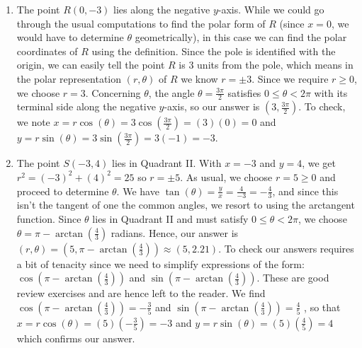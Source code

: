 {\begin{enumerate}
\item The point $R(0,-3)$ lies along the negative $y$-axis.  While we could go through the usual computations to find the polar form of $R$  (since $x=0$, we would have to determine $\theta$ geometrically), in this case we can find the polar coordinates of $R$ using the definition. Since the pole is identified with the origin, we can easily tell the point $R$ is $3$ units from the pole, which means in the polar representation $(r, \theta)$ of $R$ we know $r = \pm 3$.  Since we require $r \geq 0$, we choose $r = 3$.  Concerning $\theta$, the angle $\theta = \frac{3\pi}{2}$ satisfies $0 \leq \theta < 2\pi$ with its terminal side along the negative $y$-axis, so our answer is $\left(3, \frac{3\pi}{2}\right)$.  To check, we note $x = r \cos(\theta) = 3 \cos\left( \frac{3\pi}{2}\right) = (3)(0) = 0$ and $y = r \sin(\theta) = 3 \sin\left( \frac{3\pi}{2}\right) = 3(-1) = -3$.


\item  The point $S(-3,4)$ lies in Quadrant II.  With $x = -3$ and $y = 4$, we get $r^2 = (-3)^2 + (4)^2 = 25$ so $r = \pm 5$.  As usual, we choose $r = 5 \geq 0$ and proceed to determine $\theta$.  We have $\tan(\theta) = \frac{y}{x} = \frac{4}{-3} = -\frac{4}{3}$, and since this isn't the tangent of one the common angles, we resort to using the arctangent function. Since $\theta$ lies in Quadrant II and must satisfy $0 \leq \theta < 2\pi$, we choose $\theta = \pi - \arctan\left(\frac{4}{3}\right)$ radians.  Hence, our answer is $(r,\theta) = \left(5, \pi - \arctan\left(\frac{4}{3}\right)\right) \approx (5,2.21)$.  To check our answers requires a bit of tenacity since we need to simplify expressions of the form:  $\cos\left(\pi - \arctan\left(\frac{4}{3}\right)\right)$ and $\sin\left(\pi - \arctan\left(\frac{4}{3}\right)\right)$.  These are good review exercises and are hence left to the reader.  We find  $\cos\left(\pi - \arctan\left(\frac{4}{3}\right)\right) = -\frac{3}{5}$ and $\sin\left(\pi - \arctan\left(\frac{4}{3}\right)\right) = \frac{4}{5}$ , so that $x = r \cos(\theta) = (5)\left(-\frac{3}{5}\right) = -3$ and $y = r \sin(\theta) = (5) \left(\frac{4}{5}\right) = 4$ which confirms our answer.

\end{enumerate}


}

